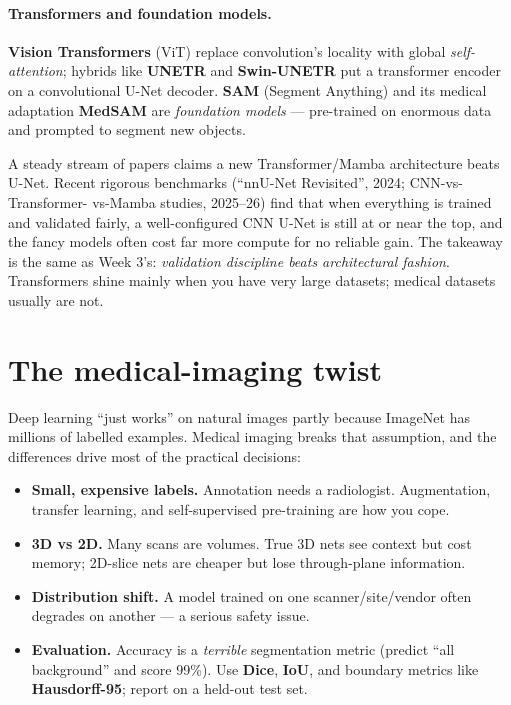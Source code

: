 \documentclass[11pt]{article}
\begin{document}
\paragraph{Transformers and foundation models.} \textbf{Vision Transformers}
(ViT) replace convolution's locality with global \emph{self-attention}; hybrids
like \textbf{UNETR} and \textbf{Swin-UNETR} put a transformer encoder on a
convolutional U-Net decoder. \textbf{SAM} (Segment Anything) and its medical
adaptation \textbf{MedSAM} are \emph{foundation models} --- pre-trained on
enormous data and prompted to segment new objects.

\begin{notebox}
A steady stream of papers claims a new Transformer/Mamba architecture beats
U-Net. Recent rigorous benchmarks (``nnU-Net Revisited'', 2024; CNN-vs-Transformer-
vs-Mamba studies, 2025--26) find that when everything is trained and validated
fairly, a well-configured CNN U-Net is still at or near the top, and the fancy
models often cost far more compute for no reliable gain. The takeaway is the same
as Week 3's: \emph{validation discipline beats architectural fashion}. Transformers
shine mainly when you have very large datasets; medical datasets usually are not.
\end{notebox}

\section{The medical-imaging twist}

Deep learning ``just works'' on natural images partly because ImageNet has
millions of labelled examples. Medical imaging breaks that assumption, and the
differences drive most of the practical decisions:
\begin{itemize}[nosep,leftmargin=*]
  \item \textbf{Small, expensive labels.} Annotation needs a radiologist.
  Augmentation, transfer learning, and self-supervised pre-training are how you
  cope.
  \item \textbf{3D vs 2D.} Many scans are volumes. True 3D nets see context but
  cost memory; 2D-slice nets are cheaper but lose through-plane information.
  \item \textbf{Distribution shift.} A model trained on one scanner/site/vendor
  often degrades on another --- a serious safety issue.
  \item \textbf{Evaluation.} Accuracy is a \emph{terrible} segmentation metric
  (predict ``all background'' and score 99\%). Use \textbf{Dice}, \textbf{IoU},
  and boundary metrics like \textbf{Hausdorff-95}; report on a held-out test set.
\end{itemize}
\end{document}
